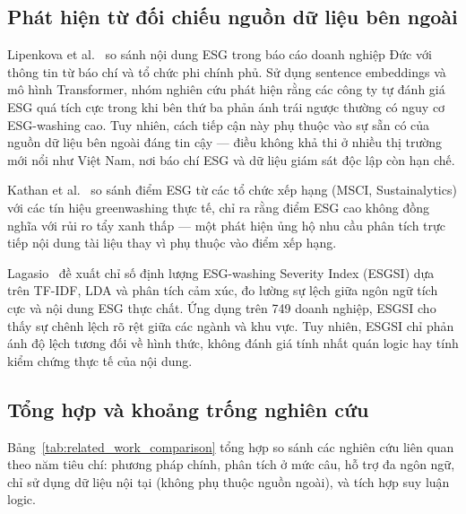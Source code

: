 \subsection{Phát hiện từ đối chiếu nguồn dữ liệu bên ngoài}
\label{subsec:rw_external}

Lipenkova et al.~\cite{lipenkova2023detecting} so sánh nội dung ESG trong báo cáo doanh nghiệp Đức với thông tin từ báo chí và tổ chức phi chính phủ. Sử dụng sentence embeddings và mô hình Transformer, nhóm nghiên cứu phát hiện rằng các công ty tự đánh giá ESG quá tích cực trong khi bên thứ ba phản ánh trái ngược thường có nguy cơ ESG-washing cao. Tuy nhiên, cách tiếp cận này phụ thuộc vào sự sẵn có của nguồn dữ liệu bên ngoài đáng tin cậy --- điều không khả thi ở nhiều thị trường mới nổi như Việt Nam, nơi báo chí ESG và dữ liệu giám sát độc lập còn hạn chế.

Kathan et al.~\cite{kathan2025you} so sánh điểm ESG từ các tổ chức xếp hạng (MSCI, Sustainalytics) với các tín hiệu greenwashing thực tế, chỉ ra rằng điểm ESG cao không đồng nghĩa với rủi ro tẩy xanh thấp --- một phát hiện ủng hộ nhu cầu phân tích trực tiếp nội dung tài liệu thay vì phụ thuộc vào điểm xếp hạng.

Lagasio~\cite{lagasio2024esg} đề xuất chỉ số định lượng ESG-washing Severity Index (ESGSI) dựa trên TF-IDF, LDA và phân tích cảm xúc, đo lường sự lệch giữa ngôn ngữ tích cực và nội dung ESG thực chất. Ứng dụng trên 749 doanh nghiệp, ESGSI cho thấy sự chênh lệch rõ rệt giữa các ngành và khu vực. Tuy nhiên, ESGSI chỉ phản ánh độ lệch tương đối về hình thức, không đánh giá tính nhất quán logic hay tính kiểm chứng thực tế của nội dung.


\subsection{Tổng hợp và khoảng trống nghiên cứu}
\label{subsec:rw_gap}

Bảng~\ref{tab:related_work_comparison} tổng hợp so sánh các nghiên cứu liên quan theo năm tiêu chí: phương pháp chính, phân tích ở mức câu, hỗ trợ đa ngôn ngữ, chỉ sử dụng dữ liệu nội tại (không phụ thuộc nguồn ngoài), và tích hợp suy luận logic.

